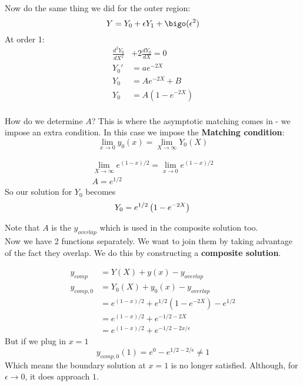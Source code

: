 \documentclass{/home/janmebows/Documents/LatexTemplates/myassignment}
\begin{document}
Now do the same thing we did for the outer region:
\[Y = Y_0 + \epsilon Y_1 + \bigo(\epsilon^2)\]
At order 1:
\begin{align*}
    \frac{d^2Y_0}{dX^2}& + 2 \frac{dY_0}{dX} =0\\
    Y_0' &= ae^{-2X}\\
    Y_0 &= Ae^{-2X} + B\\
    Y_0 &= A\left(1- e^{-2X} \right)\\
\end{align*}

How do we determine $A$? This is where the asymptotic matching comes in - we impose an extra condition. In this case we impose the \textbf{Matching condition}:
\[\lim_{x\to 0} y_0(x) = \lim_{X\to \infty} Y_0(X) \]

\begin{align*}
    \lim_{X\to \infty} e^{(1-x)/2} = \lim_{x \to 0} e^{(1-x)/2}\\
    A = e^{1/2} 
\end{align*}
So our solution for $Y_0$ becomes
\[Y_0 = e^{1/2}\left(1- e^{-2X} \right)\\\]

Note that $A$ is the $y_{overlap}$ which is used in the composite solution too.\\
Now we have 2 functions separately. We want to join them by taking advantage of the fact they overlap. We do this by constructing a \textbf{composite solution}.

\begin{align*}
    y_{comp} &= Y(X) + y(x) - y_{overlap}\\
    y_{comp,0} &= Y_0(X) + y_0(x) - y_{overlap}\\
    &=e^{(1-x)/2} + e^{1/2}\left(1-e^{-2X}\right) - e^{1/2}\\
    &=e^{(1-x)/2} + e^{-1/2 - 2X}\\
    &=e^{(1-x)/2} + e^{-1/2 - 2x/\epsilon}
\end{align*}
But if we plug in $x=1$
\[y_{comp,0}(1) = e^{0} - e^{1/2 -2/\epsilon} \neq 1 \]
Which means the boundary solution at $x=1$ is no longer satisfied. Although, for $\epsilon \to 0$, it does approach $1$.
\end{document}

